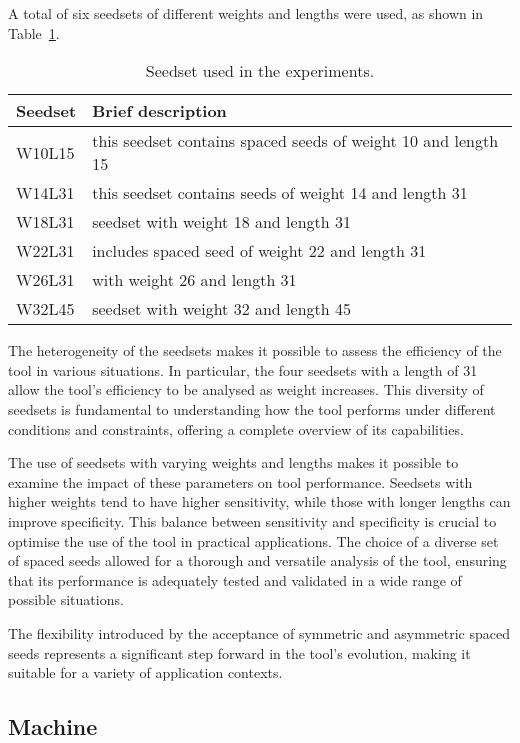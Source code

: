 	A total of six seedsets of different weights and lengths were used, as shown in Table~\ref{tab:seedset}.
	\begin{table}[!ht]
		\centering
		\begin{tabular}{l l}
			\textbf{Seedset} & \textbf{Brief description} \\
			\toprule
			W10L15 & this seedset contains spaced seeds of weight 10 and length 15 \\
			W14L31 & this seedset contains seeds of weight 14 and length 31 \\
			W18L31 & seedset with weight 18 and length 31 \\
			W22L31 & includes spaced seed of weight 22 and length 31 \\
			W26L31 & with weight 26 and length 31 \\
			W32L45 & seedset with weight 32 and length 45 \\
			\bottomrule
		\end{tabular}
		\caption{Seedset used in the experiments.}
		\label{tab:seedset}
	\end{table}
	
	The heterogeneity of the seedsets makes it possible to assess the efficiency of the tool in various situations. In particular, the four seedsets with a length of 31 allow the tool's efficiency to be analysed as weight increases. This diversity of seedsets is fundamental to understanding how the tool performs under different conditions and constraints, offering a complete overview of its capabilities. 
	
	The use of seedsets with varying weights and lengths makes it possible to examine the impact of these parameters on tool performance. Seedsets with higher weights tend to have higher sensitivity, while those with longer lengths can improve specificity. This balance between sensitivity and specificity is crucial to optimise the use of the tool in practical applications. The choice of a diverse set of spaced seeds allowed for a thorough and versatile analysis of the tool, ensuring that its performance is adequately tested and validated in a wide range of possible situations.
	
	The flexibility introduced by the acceptance of symmetric and asymmetric spaced seeds represents a significant step forward in the tool's evolution, making it suitable for a variety of application contexts.
	
	
	
	
	\subsection{Machine}
	\label{subsec:machine}
	
